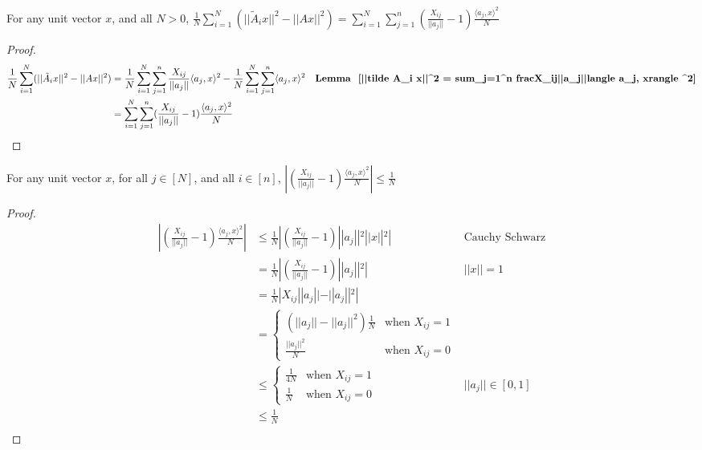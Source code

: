 \begin{lemma}
\label{frac1Nsum_i=1^N(||tilde A_ix||^2 - ||Ax||^2) = sum_i=1^Nsum_j=1^n(fracX_ij||a_j|| - 1) fraclangle a_j, xrangle^2N}
    For any unit vector $x$, and all $N > 0$, $\frac{1}{N}\sum_{i=1}^N(||\tilde A_ix||^2 - ||Ax||^2) = \sum_{i=1}^N\sum_{j=1}^n(\frac{X_{ij}}{||a_j||} - 1) \frac{\langle a_j, x\rangle^2}{N}$
\end{lemma}

\begin{proof}
    \begin{align*}
        \frac{1}{N}\sum_{i=1}^N(||\tilde A_ix||^2 - ||Ax||^2) &= \frac{1}{N}\sum_{i=1}^N\sum_{j=1}^n\frac{X_{ij}}{||a_j||}\langle a_j, x\rangle^2 - \frac{1}{N}\sum_{i=1}^N\sum_{j=1}^n\langle a_j, x\rangle^2 & \textbf{Lemma ~\ref{||tilde A_i x||^2 = sum_j=1^n fracX_ij||a_j||langle a_j, xrangle ^2}}\\
         &= \sum_{i=1}^N\sum_{j=1}^n(\frac{X_{ij}}{||a_j||} - 1)\frac{\langle a_j, x\rangle^2}{N} \\
    \end{align*}
\end{proof}

\begin{lemma}
\label{|(fracX_ij||a_j|| - 1)fraclangle a_j, xrangle ^2N| le frac1N}
    For any unit vector $x$, for all $j \in [N]$, and all $i \in [n]$, $|(\frac{X_{ij}}{||a_j||} - 1)\frac{\langle a_j, x\rangle ^2}{N}| \le \frac{1}{N}$
\end{lemma}

\begin{proof}
    \begin{align*}
        |(\frac{X_{ij}}{||a_j||} - 1)\frac{\langle a_j, x\rangle ^2}{N}| &\le \frac{1}{N} | (\frac{X_{ij}}{||a_j||} - 1) ||a_j||^2 ||x||^2 | &\text{Cauchy Schwarz}  \\
        &= \frac{1}{N} | (\frac{X_{ij}}{||a_j||} - 1) ||a_j||^2 | &||x|| = 1\\
        &= \frac{1}{N} | X_{ij}||a_j|| - ||a_j||^2 | &\\
        &=\begin{cases} 
               (||a_j|| - ||a_j||^2)\frac{1}{N}& \text{when } X_{ij} = 1\\
               \frac{||a_j||^2}{N} & \text{when } X_{ij} = 0
           \end{cases}\\
        &\le \begin{cases} 
               \frac{1}{4N} & \text{when } X_{ij} = 1\\
               \frac{1}{N} & \text{when } X_{ij} = 0
           \end{cases} & ||a_j|| \in [0, 1]\\
        &\le  \frac{1}{N} \\
    \end{align*}
\end{proof}

